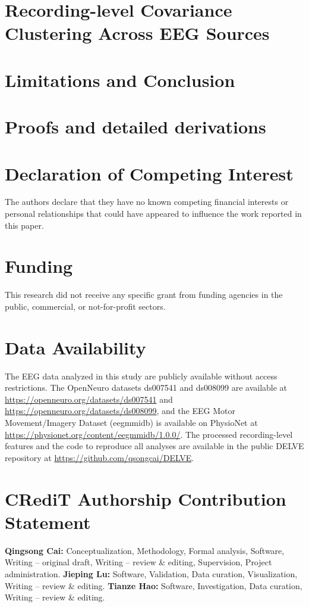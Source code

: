 \documentclass[preprint,12pt]{elsarticle}
\theoremstyle{plain}
\theoremstyle{definition}
\theoremstyle{remark}
\begin{document}
\section{Recording-level Covariance Clustering Across EEG Sources}


\section{Limitations and Conclusion}


\appendix
\section{Proofs and detailed derivations}



\section*{Declaration of Competing Interest}
The authors declare that they have no known competing financial interests or personal relationships that could have appeared to influence the work reported in this paper.

\section*{Funding}
This research did not receive any specific grant from funding agencies in the public, commercial, or not-for-profit sectors.

\section*{Data Availability}
The EEG data analyzed in this study are publicly available without access restrictions. The OpenNeuro datasets ds007541 and ds008099 are available at \url{https://openneuro.org/datasets/ds007541} and \url{https://openneuro.org/datasets/ds008099}, and the EEG Motor Movement/Imagery Dataset (eegmmidb) is available on PhysioNet at \url{https://physionet.org/content/eegmmidb/1.0.0/}. The processed recording-level features and the code to reproduce all analyses are available in the public DELVE repository at \url{https://github.com/qsongcai/DELVE}.

\section*{CRediT Authorship Contribution Statement}
\textbf{Qingsong Cai:} Conceptualization, Methodology, Formal analysis, Software, Writing -- original draft, Writing -- review \& editing, Supervision, Project administration. \textbf{Jieping Lu:} Software, Validation, Data curation, Visualization, Writing -- review \& editing. \textbf{Tianze Hao:} Software, Investigation, Data curation, Writing -- review \& editing.


\begingroup
\sloppy
\setlength{\emergencystretch}{3em}
\mathchardef{}
\mathchardef{}
\let\newline\relax
\def\urlprefix{\unskip\hskip 0.5em plus 0.2em}

\endgroup
\end{document}
